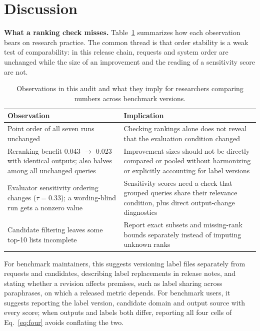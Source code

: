 \documentclass[conference]{IEEEtran}
\begin{document}
\section{Discussion}\label{sec:discussion}
\textbf{What a ranking check misses.} Table~\ref{tab:implications} summarizes how each observation bears on research practice. The common thread is that order stability is a weak test of comparability: in this release chain, requests and system order are unchanged while the size of an improvement and the reading of a sensitivity score are not.

\begin{table}[!t]
\centering
\caption{Observations in this audit and what they imply for researchers comparing numbers across benchmark versions.}
\label{tab:implications}
\footnotesize
\setlength{\tabcolsep}{3pt}
\begin{tabular}{@{}>{\raggedright\arraybackslash}p{}>{\raggedright\arraybackslash}p{}@{}}
\toprule
Observation & Implication\\
\midrule
Point order of all seven runs unchanged & Checking rankings alone does not reveal that the evaluation condition changed\\
Reranking benefit 0.043 $\rightarrow$ 0.023 with identical outputs; also halves among all unchanged queries & Improvement sizes should not be directly compared or pooled without harmonizing or explicitly accounting for label versions\\
Evaluator sensitivity ordering changes ($\tau=0.33$); a wording-blind run gets a nonzero value & Sensitivity scores need a check that grouped queries share their relevance condition, plus direct output-change diagnostics\\
Candidate filtering leaves some top-10 lists incomplete & Report exact subsets and missing-rank bounds separately instead of imputing unknown ranks\\
\bottomrule
\end{tabular}
\end{table}

For benchmark maintainers, this suggests versioning label files separately from requests and candidates, describing label replacements in release notes, and stating whether a revision affects premises, such as label sharing across paraphrases, on which a released metric depends. For benchmark users, it suggests reporting the label version, candidate domain and output source with every score; when outputs and labels both differ, reporting all four cells of Eq.~\eqref{eq:four} avoids conflating the two.
\end{document}
